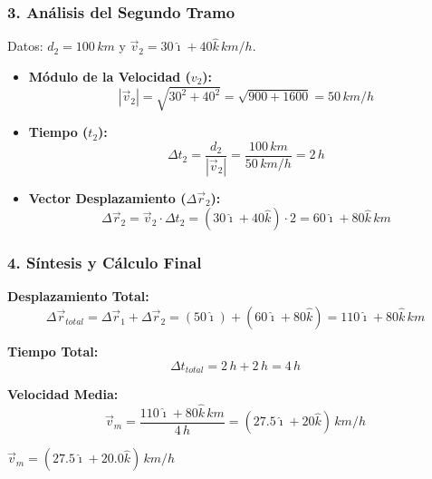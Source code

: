 \documentclass[12pt, a4paper]{article}
\begin{document}
\subsubsection*{3. Análisis del Segundo Tramo}

Datos: $d_2 = 100 \, \si{km}$ y $\vec{v}_2 = 30 \hat{\imath} + 40 \hat{k} \, \si{km/h}$.
\begin{itemize}
    \item \textbf{Módulo de la Velocidad ($v_2$):}
    \begin{equation}
        |\vec{v}_2| = \sqrt{30^2 + 40^2} = \sqrt{900 + 1600} = 50 \, \si{km/h}
    \end{equation}
    \item \textbf{Tiempo ($t_2$):}
    \begin{equation}
        \Delta t_2 = \frac{d_2}{|\vec{v}_2|} = \frac{100 \, \si{km}}{50 \, \si{km/h}} = 2 \, \si{h}
    \end{equation}
    \item \textbf{Vector Desplazamiento ($\Delta \vec{r}_2$):}
    \begin{equation}
        \Delta \vec{r}_2 = \vec{v}_2 \cdot \Delta t_2 = (30 \hat{\imath} + 40 \hat{k}) \cdot 2 = 60 \hat{\imath} + 80 \hat{k} \, \si{km}
    \end{equation}
\end{itemize}

\subsubsection*{4. Síntesis y Cálculo Final}

\textbf{Desplazamiento Total:}
\begin{equation}
    \Delta \vec{r}_{total} = \Delta \vec{r}_1 + \Delta \vec{r}_2 = (50 \hat{\imath}) + (60 \hat{\imath} + 80 \hat{k}) = 110 \hat{\imath} + 80 \hat{k} \, \si{km}
\end{equation}

\textbf{Tiempo Total:}
\begin{equation}
    \Delta t_{total} = 2 \, \si{h} + 2 \, \si{h} = 4 \, \si{h}
\end{equation}

\textbf{Velocidad Media:}
\begin{equation}
    \vec{v}_m = \frac{110 \hat{\imath} + 80 \hat{k} \, \si{km}}{4 \, \si{h}} = (27.5 \hat{\imath} + 20 \hat{k}) \, \si{km/h}
\end{equation}

\begin{tcolorbox}[colback=blue!5!white, colframe=blue!75!black, title=Respuesta Final]
\centering
\Large $\vec{v}_m = (27.5 \hat{\imath} + 20.0 \hat{k}) \, \si{km/h}$
\end{tcolorbox}
\end{document}
